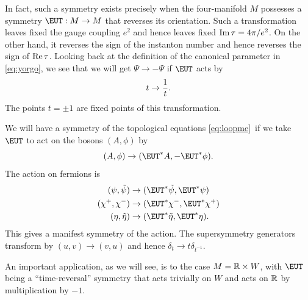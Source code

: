 In fact, such a symmetry exists precisely when the four-manifold
$M$ possesses a symmetry  ${\EUT}:M\to M$  that reverses its
orientation. Such a transformation leaves fixed the gauge coupling
$e^2$ and hence leaves fixed ${\rm Im}\,\tau=4\pi/e^2$. On the
other hand, it reverses the sign of the instanton number and hence
reverses the sign of ${\rm Re}\,\tau$.  Looking back at the
definition of the canonical parameter in \eqref{eq:yorgo}, we see that we
will get $\Psi\to-\Psi$ if ${\EUT}$ acts by %
\setcounter{equation}{55}
\begin{equation}\label{eq:zongor}
t\to
{1\over t}.
\end{equation}
 The points $t=\pm 1$ are fixed points of this
transformation.

We will have a symmetry of the topological equations \eqref{eq:loopme}\ if
we take ${\EUT}$ to act on the bosons $(A,\phi)$ by
\setcounter{equation}{56}
\begin{equation}\label{eq:yoro}
(A,\phi)\to ({\EUT}^*A,-{\EUT}^*\phi).
\end{equation}
 The action on
fermions is %
\setcounter{equation}{57}
\begin{equation}\label{eq:zoro}
\begin{aligned}(\psi,\tilde\psi)&\to
({\EUT}^*\tilde\psi,{\EUT}^*\psi)\\ (\chi^+,\chi^-)&\to
({\EUT}^*\chi^-,{\EUT}^*\chi^+)\\ (\eta,\tilde\eta)&\to
({\EUT}^*\tilde\eta,{\EUT}^*\eta).\\\end{aligned}
\end{equation}
  This gives a manifest
symmetry of the action.  The supersymmetry generators transform by
$(u,v)\to(v,u)$ and hence $\delta_t\to t\delta_{t^{-1}}$.

An important application, as we will see, is to the case
$M=\Bbb{R}\times W$, with ${\EUT}$ being a ``time-reversal''
symmetry that acts trivially on $W$ and acts on $\Bbb{R}$ by
multiplication by $-1$.
